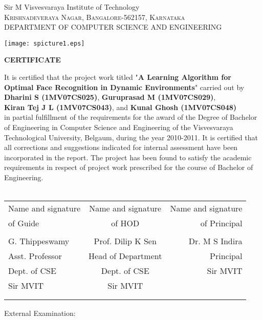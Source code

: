 \documentclass[10pt,a4paper]{article}
\newcommand{\tabcer}{\hspace*{1 cm}}
\begin{document}
\thispagestyle{empty}

\begin{center}
\LARGE{Sir M Visvesvaraya Institute of Technology}\\
\vspace{1mm}
\normalsize\textsc{Krishnadeveraya Nagar, Bangalore-562157, Karnataka\\ }
\vspace{3mm}
\normalsize{DEPARTMENT OF COMPUTER SCIENCE  AND  ENGINEERING}

\vspace{3mm}
\texttt{[image: spicture1.eps]}

\vspace{3mm}

\textup{\Large \textbf{CERTIFICATE}} 							
\vspace{3mm}
\end{center} 								

It is certified that the project work titled "\textbf{A Learning Algorithm for \\
Optimal Face Recognition in Dynamic Environments}" carried out by \\
\textbf{Dharini S (1MV07CS025)}, \textbf{Guruprasad M (1MV07CS029)}, \\ \textbf{Kiran Tej J L (1MV07CS043)}, and \textbf{Kunal Ghosh (1MV07CS048)} \\
in partial fulfillment of the requirements for the award of the Degree of Bachelor of Engineering in Computer Science and Engineering of the Visvesvaraya Technological University, Belgaum, during the year 2010-2011. It is certified that all corrections and suggestions indicated for internal assessment have been incorporated in the report. The project has been found to satisfy the academic requirements in respect of project work prescribed for the course of Bachelor of Engineering. \\ \\

\vspace{8mm}




\begin{table}[h]
\begin{tabular}{l c r}
Name and signature \tabcer & Name and signature \tabcer  & Name and signature  \\
of Guide   \tabcer &   of HOD             \tabcer & \tabcer of Principal \\
\\ 
G. Thippeswamy \tabcer & Prof. Dilip K Sen \tabcer & Dr. M S Indira \\
Asst. Professor \tabcer & Head of Department \tabcer & Principal \\
Dept. of CSE	\tabcer & Dept. of CSE \tabcer &	Sir MVIT \\
Sir MVIT \tabcer & Sir MVIT \tabcer \\ \\ \\ 
\end{tabular}
\end{table}
External Examination: \\ 
\end{document}
